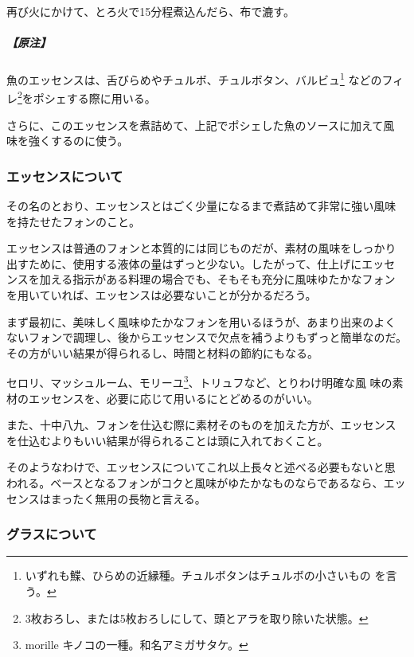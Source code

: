 \begin{recette}
再び火にかけて、とろ火で15分程煮込んだら、布で漉す。

\hypertarget{nota-essence-de-poisson}{%
\subparagraph{【原注】}\label{nota-essence-de-poisson}}

魚のエッセンスは、舌びらめやチュルボ、チュルボタン、バルビュ\footnote{いずれも鰈、ひらめの近縁種。チュルボタンはチュルボの小さいもの
  を言う。} などのフィレ\footnote{3枚おろし、または5枚おろしにして、頭とアラを取り除いた状態。}をポシェする際に用いる。

さらに、このエッセンスを煮詰めて、上記でポシェした魚のソースに加えて風
味を強くするのに使う。

\hypertarget{essences-diverses}{%
\subsubsection{エッセンスについて}\label{essences-diverses}}



その名のとおり、エッセンスとはごく少量になるまで煮詰めて非常に強い風味
を持たせたフォンのこと。

エッセンスは普通のフォンと本質的には同じものだが、素材の風味をしっかり
出すために、使用する液体の量はずっと少ない。したがって、仕上げにエッセ
ンスを加える指示がある料理の場合でも、そもそも充分に風味ゆたかなフォン
を用いていれば、エッセンスは必要ないことが分かるだろう。

まず最初に、美味しく風味ゆたかなフォンを用いるほうが、あまり出来のよく
ないフォンで調理し、後からエッセンスで欠点を補うよりもずっと簡単なのだ。
その方がいい結果が得られるし、時間と材料の節約にもなる。

セロリ、マッシュルーム、モリーユ\footnote{morille
  キノコの一種。和名アミガサタケ。}、トリュフなど、とりわけ明確な風
味の素材のエッセンスを、必要に応じて用いるにとどめるのがいい。

また、十中八九、フォンを仕込む際に素材そのものを加えた方が、エッセンス
を仕込むよりもいい結果が得られることは頭に入れておくこと。

そのようなわけで、エッセンスについてこれ以上長々と述べる必要もないと思
われる。ベースとなるフォンがコクと風味がゆたかなものならであるなら、エッ
センスはまったく無用の長物と言える。

\hypertarget{glaces-diverses}{%
\subsubsection{グラスについて}\label{glaces-diverses}}


\end{recette}
